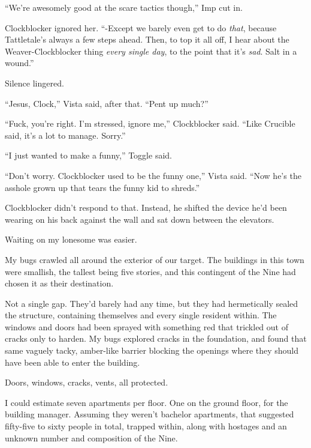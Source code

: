 ``We're awesomely good at the scare tactics though,'' Imp cut in.



Clockblocker ignored her.  ``-Except we barely even get to do \emph{that}, because Tattletale's always a few steps ahead.  Then, to top it all off, I hear about the Weaver-Clockblocker thing \emph{every single day}, to the point that it's \emph{sad}.  Salt in a wound.''



Silence lingered.



``Jesus, Clock,'' Vista said, after that.  ``Pent up much?''



``Fuck, you're right.  I'm stressed, ignore me,'' Clockblocker said.  ``Like Crucible said, it's a lot to manage.  Sorry.''



``I just wanted to make a funny,'' Toggle said.



``Don't worry.  Clockblocker used to be the funny one,'' Vista said.  ``Now he's the asshole grown up that tears the funny kid to shreds.''



Clockblocker didn't respond to that.  Instead, he shifted the device he'd been wearing on his back against the wall and sat down between the elevators.



Waiting on my lonesome was easier.



My bugs crawled all around the exterior of our target.  The buildings in this town were smallish, the tallest being five stories, and this contingent of the Nine had chosen it as their destination.



Not a single gap.  They'd barely had any time, but they had hermetically sealed the structure, containing themselves and every single resident within.  The windows and doors had been sprayed with something red that trickled out of cracks only to harden.  My bugs explored cracks in the foundation, and found that same vaguely tacky, amber-like barrier blocking the openings where they should have been able to enter the building.



Doors, windows, cracks, vents, all protected.



I could estimate seven apartments per floor.  One on the ground floor, for the building manager.  Assuming they weren't bachelor apartments, that suggested fifty-five to sixty people in total, trapped within, along with hostages and an unknown number and composition of the Nine.



